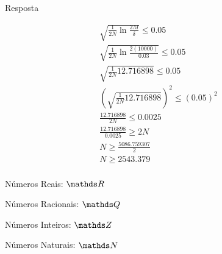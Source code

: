  Resposta

\begin{align*}
	\sqrt{\frac{1}{2N} \ln{\frac{2M}{\delta}}} \le 0.05 \\
	\sqrt{\frac{1}{2N} \ln{\frac{2(10000)}{0.03}}} \le 0.05 \\
	\sqrt{\frac{1}{2N} {12.716898}} \le 0.05 \\
	\left( \sqrt{\frac{1}{2N} {12.716898}} \right) ^ {2} \le (0.05)^{2} \\
	\frac{12.716898}{2N} \le 0.0025 \\
	\frac{12.716898}{0.0025} \ge 2N \\
	N \ge \frac{5086.759307}{2} \\
	N \ge {2543.379} \\
\end{align*}

Números Reais: $\conjR$

Números Racionais: $\conjQ$

Números Inteiros: $\conjZ$

Números Naturais: $\conjN$

